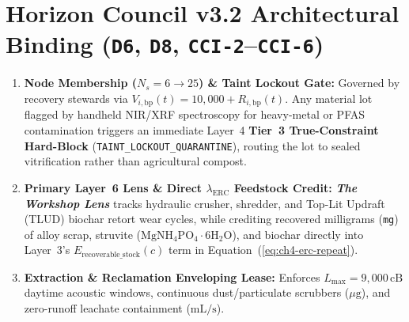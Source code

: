 \section{Horizon Council v3.2 Architectural Binding (\texttt{D6}, \texttt{D8}, \texttt{CCI-2}--\texttt{CCI-6})}
\begin{enumerate}
    \item \textbf{Node Membership ($N_s = 6 \to 25$) \& Taint Lockout Gate:} Governed by recovery stewards via $V_{i,\mathrm{bp}}(t) = 10{,}000 + R_{i,\mathrm{bp}}(t)$. Any material lot flagged by handheld NIR/XRF spectroscopy for heavy-metal or PFAS contamination triggers an immediate Layer~4 \textbf{Tier~3 True-Constraint Hard-Block} (\texttt{TAINT\_LOCKOUT\_QUARANTINE}), routing the lot to sealed vitrification rather than agricultural compost.
    \item \textbf{Primary Layer~6 Lens \& Direct $\lambda_{\mathrm{ERC}}$ Feedstock Credit:} \textbf{\textit{The Workshop Lens}} tracks hydraulic crusher, shredder, and Top-Lit Updraft (TLUD) biochar retort wear cycles, while crediting recovered milligrams (\texttt{mg}) of alloy scrap, struvite ($\mathrm{MgNH_4PO_4 \cdot 6H_2O}$), and biochar directly into Layer~3's $E_{\mathrm{recoverable\_stock}}(c)$ term in Equation~(\ref{eq:ch4-erc-repeat}).
    \item \textbf{Extraction \& Reclamation Enveloping Lease:} Enforces $L_{\max} = 9{,}000\,\mathrm{cB}$ daytime acoustic windows, continuous dust/particulate scrubbers ($\mu\mathrm{g}$), and zero-runoff leachate containment ($\mathrm{mL/s}$).
\end{enumerate}

